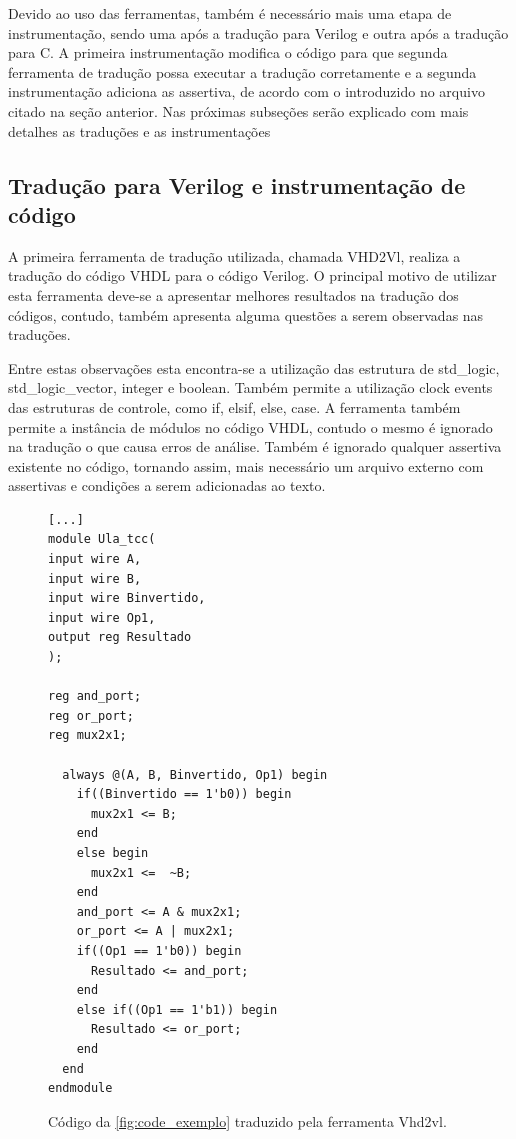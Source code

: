 \par
Devido ao uso das ferramentas, também é necessário mais uma etapa de instrumentação, sendo uma após a tradução para Verilog e outra após a tradução para C. A primeira instrumentação modifica o código para que segunda ferramenta de tradução possa executar a tradução corretamente e a segunda instrumentação adiciona as assertiva, de acordo com o introduzido no arquivo citado na seção anterior. Nas próximas subseções serão explicado com mais detalhes as traduções e as instrumentações

\subsection{Tradução para Verilog e instrumentação de código}

\par
A primeira ferramenta de tradução utilizada, chamada VHD2Vl\cite{vhd2vl}, realiza a tradução do código VHDL para o código Verilog. O principal motivo de utilizar esta ferramenta deve-se a apresentar melhores resultados na tradução dos códigos, contudo, também apresenta alguma questões a serem observadas nas traduções. 

\par

Entre estas observações esta encontra-se a utilização das estrutura de std\_logic, std\_logic\_vector, integer e boolean. Também permite a utilização clock events das estruturas de controle, como if, elsif, else, case. A ferramenta também permite a instância de módulos no código VHDL, contudo o mesmo é ignorado na tradução o que causa erros de análise. Também é ignorado qualquer assertiva existente no código, tornando assim, mais necessário um arquivo externo com assertivas e condições a serem adicionadas ao texto\cite{vhd2vl}.


\begin{figure}[H]
\caption{\label{fig:codigo_verilog} Código da \autoref{fig:code_exemplo} traduzido pela ferramenta Vhd2vl.}
	\begin{center}
    \begin{minipage}{0.7\textwidth}
    \begin{lstlisting}
[...]
module Ula_tcc(
input wire A,
input wire B,
input wire Binvertido,
input wire Op1,
output reg Resultado
);

reg and_port;
reg or_port;
reg mux2x1;

  always @(A, B, Binvertido, Op1) begin
    if((Binvertido == 1'b0)) begin
      mux2x1 <= B;
    end
    else begin
      mux2x1 <=  ~B;
    end
    and_port <= A & mux2x1;
    or_port <= A | mux2x1;
    if((Op1 == 1'b0)) begin
      Resultado <= and_port;
    end
    else if((Op1 == 1'b1)) begin
      Resultado <= or_port;
    end
  end
endmodule
    \end{lstlisting}
    \end{minipage}
	\end{center}
\end{figure}

